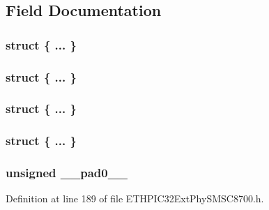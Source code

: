 \subsection{Field Documentation}
\hypertarget{union_____i_n_t_m_a_s_kbits__t_af3d2536305f29723cc27ed56c101b0d9}{}\subsubsection[{"@236}]{\setlength{\rightskip}{0pt plus 5cm}struct \{ ... \} }\label{union_____i_n_t_m_a_s_kbits__t_af3d2536305f29723cc27ed56c101b0d9}
\hypertarget{union_____i_n_t_m_a_s_kbits__t_aa800b64644bd18e8a9e2f6290a048e03}{}\subsubsection[{"@238}]{\setlength{\rightskip}{0pt plus 5cm}struct \{ ... \} }\label{union_____i_n_t_m_a_s_kbits__t_aa800b64644bd18e8a9e2f6290a048e03}
\hypertarget{union_____i_n_t_m_a_s_kbits__t_a0a6a1b50b2243b8baba26bc987c6cd71}{}\subsubsection[{"@264}]{\setlength{\rightskip}{0pt plus 5cm}struct \{ ... \} }\label{union_____i_n_t_m_a_s_kbits__t_a0a6a1b50b2243b8baba26bc987c6cd71}
\hypertarget{union_____i_n_t_m_a_s_kbits__t_a0a67d97f3c7fd81bb6657e0e8606b6ae}{}\subsubsection[{"@266}]{\setlength{\rightskip}{0pt plus 5cm}struct \{ ... \} }\label{union_____i_n_t_m_a_s_kbits__t_a0a67d97f3c7fd81bb6657e0e8606b6ae}
\hypertarget{union_____i_n_t_m_a_s_kbits__t_adf71f3d8410c1f1dbbc96680a92c49af}{}
\subsubsection[{\+\_\+\+\_\+pad0\+\_\+\+\_\+}]{\setlength{\rightskip}{0pt plus 5cm}unsigned \+\_\+\+\_\+pad0\+\_\+\+\_\+}\label{union_____i_n_t_m_a_s_kbits__t_adf71f3d8410c1f1dbbc96680a92c49af}


Definition at line 189 of file E\+T\+H\+P\+I\+C32\+Ext\+Phy\+S\+M\+S\+C8700.\+h.

